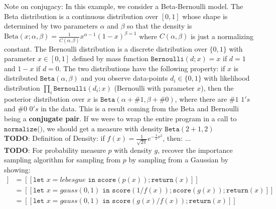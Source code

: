 \documentclass[11pt]{article}
\theoremstyle{definition}
\theoremstyle{plain}
\newcommand{\Beta}{\text{Beta}}
\renewcommand{\b}[1]{\mathbb{#1}}
\begin{document}
\noindent Note on conjugacy: In this example, we consider a Beta-Bernoulli model. 
The Beta distribution is a continuous distribution over $[0,1]$ whose shape is determined by two parameters $\alpha$ and $\beta$ so that the density is 
$\Beta(x;\alpha,\beta) = \frac{1}{C(\alpha,\beta)}x^{\alpha-1} (1-x)^{\beta=1}$ where $C(\alpha,\beta)$ is just a normalizing constant. 
The Bernoulli distribution is a discrete distribution over $\{0,1\}$ with parameter $x \in [0,1]$
defined by mass function $\texttt{Bernoulli}(d;x) = x$ if $d=1$ and $1-x$ if $d=0$. The two distributions have the following property:
if $x$ is distributed $\texttt{Beta}(\alpha,\beta)$ and you observe data-points $d_i \in \{0,1\}$ with likelihood distribution
$\prod_i \texttt{Bernoulli}(d_i;x)$ (Bernoulli with parameter $x$), then the posterior distribution over $x$ is $\texttt{Beta}(\alpha + \#1,\beta + \#0)$, where
there are $\#1$ $1's$ and $\#0$ $0's$ in the data. This is a result coming from the Beta and Bernoulli being a \textbf{conjugate pair}. If we were to wrap
the entire program in a call to $\texttt{normalize()}$, we should get a measure with density $\texttt{Beta}(2 + 1, 2)$\\

\noindent \textbf{TODO}: Definition of Density: if $f(x)=\frac{1}{\sqrt{2 \pi}} e^{-\frac{1}{2}x^2}$,
then: ...\\


\noindent \textbf{TODO}: For probability measure $p$ with density $g$, recover the importance
sampling algorithm for sampling from $p$ by sampling from a Gaussian by showing:
\begin{align*}
    [[\texttt{sample}(p)]] &= [[\texttt{let } x = lebesgue
           \texttt{ in score}(p(x)); \texttt {return}(x) ]]\\
                    &= [[\texttt{let } x = gauss(0,1) \texttt{ in score}
                (1/f(x)); \texttt{score}(g(x));\texttt{return}(x)]]\\
                &= [[\texttt{let } x = gauss(0,1) \texttt{ in score}
                (g(x)/f(x)); \texttt{return}(x)]]
\end{align*}
\end{document}
